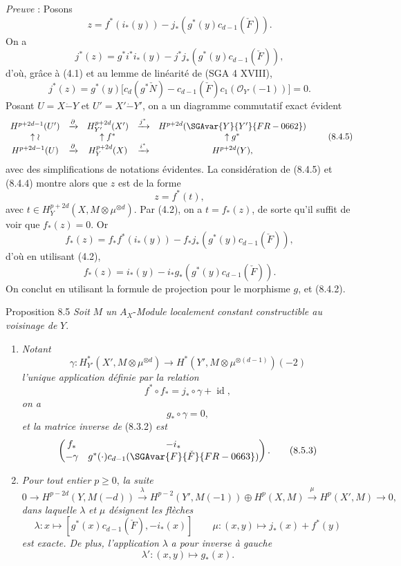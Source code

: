 \emph{Preuve} : Posons
\[
z=f^*(i_*(y))-j_*(g^*(y)c_{d-1}(\check F)).
\]
On a
\[
j^*(z)=g^*i^*i_*(y)-j^*j_*(g^*(y)c_{d-1}(\check F)),
\]
d'où, grâce à (4.1) et au lemme de linéarité de (SGA 4 XVIII),
\[
j^*(z)=g^*(y)\bigl[c_d(g^*\check N)-c_{d-1}(\check F)c_1(\mathcal{O}_{Y'}(-1))\bigr]=0.
\tag{8.4.4}
\]
Posant $U=X\mathbin{\dot{-}}Y$ et $U'=X'\mathbin{\dot{-}}Y'$, on a un diagramme commutatif exact évident
\[
\begin{array}{ccccc}
H^{p+2d-1}(U')&\xrightarrow{\partial}&H^{p+2d}_{Y'}(X')&\xrightarrow{j^*}&H^{p+2d}(\SGAvar{Y}{Y'}{FR-0662})\\
\uparrow\wr&&\uparrow f^*&&\uparrow g^*\\
H^{p+2d-1}(U)&\xrightarrow{\partial}&H_Y^{p+2d}(X)&\xrightarrow{i^*}&H^{p+2d}(Y),
\end{array}
\tag{8.4.5}
\]
avec des simplifications de notations évidentes. La considération de (8.4.5) et (8.4.4) montre alors que $z$ est de la forme
\[
z=f^*(t),
\]
avec $t\in H_Y^{p+2d}(X,M\otimes\mu^{\otimes d})$. Par (4.2), on a $t=f_*(z)$, de sorte qu'il suffit de voir que $f_*(z)=0$. Or
\[
f_*(z)=f_*f^*(i_*(y))-f_*j_*(g^*(y)c_{d-1}(\check F)),
\]
d'où en utilisant (4.2),
\[
f_*(z)=i_*(y)-i_*g_*(g^*(y)c_{d-1}(\check F)).
\]
On conclut en utilisant la formule de projection pour le morphisme $g$, et (8.4.2).

\begin{statement}{Proposition 8.5}
\emph{Soit} $M$ \emph{un} $A_X$-\emph{Module localement constant constructible au voisinage de} $Y$.
\begin{enumerate}[label=\alph*)]
\item \emph{Notant}
\[
\gamma:H_{Y'}^*(X',M\otimes\mu^{\otimes d})\to
H^*(Y',M\otimes\mu^{\otimes(d-1)})(-2)
\]
\emph{l'unique application définie par la relation}
\[
f^*\circ f_* = j_*\circ\gamma+\operatorname{id},
\tag{8.5.1}
\]
\emph{on a}
\[
g_*\circ\gamma=0,
\tag{8.5.2}
\]
\emph{et la matrice inverse de} (8.3.2) \emph{est}
\[
\begin{pmatrix}
f_*&-i_*\\
-\gamma&g^*(\cdot)c_{d-1}(\SGAvar{F}{\check F}{FR-0663})
\end{pmatrix}.
\tag{8.5.3}
\]
\item \emph{Pour tout entier} $p\ge0$, \emph{la suite}
\[
0\to H^{p-2d}(Y,M(-d))
\xrightarrow{\lambda}
H^{p-2}(Y',M(-1))\oplus H^p(X,M)
\xrightarrow{\mu}
H^p(X',M)\to0,
\]
\emph{dans laquelle} $\lambda$ \emph{et} $\mu$ \emph{désignent les flèches}
\[
\lambda : x\longmapsto [g^*(x)c_{d-1}(\check F),-i_*(x)]
\qquad
\mu : (x,y)\mapsto j_*(x)+f^*(y)
\]
\emph{est exacte. De plus, l'application} $\lambda$ \emph{a pour inverse à gauche}
\[
\lambda' : (x,y)\longmapsto g_*(x).
\]
\end{enumerate}
\end{statement}

